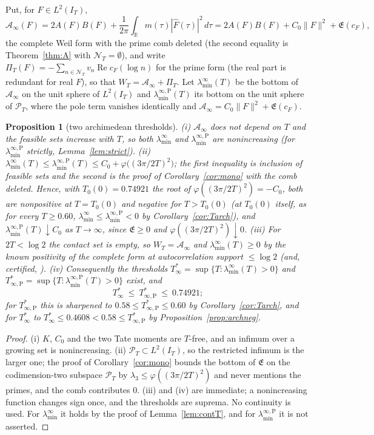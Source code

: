 \documentclass[11pt]{amsart}
\newtheorem{proposition}[theorem]{Proposition}
\theoremstyle{definition}
\theoremstyle{remark}
\newcommand{\R}{\mathbb R}
\newcommand{\Rel}{\operatorname{Re}}
\newcommand{\PT}{\mathcal P_T}
\newcommand{\IT}{I_T}
\newcommand{\Fh}{\widehat F}
\newcommand{\cF}{c_F}
\newcommand{\Lev}{\mathfrak E}
\newcommand{\NT}{\mathcal N_T}
\newcommand{\Ainf}{\mathcal A_\infty}
\newcommand{\PiT}{\Pi_T}
\newcommand{\laminf}{\lambda^{\infty}_{\min}}
\newcommand{\laminfP}{\lambda^{\infty,\mathrm P}_{\min}}
\begin{document}
Put, for $F\in L^2(\IT)$,
\[
\Ainf(F)=2A(F)B(F)+\frac1{2\pi}\int_\R m(\tau)|\Fh(\tau)|^2\,d\tau
=2A(F)B(F)+C_0\|F\|^2+\Lev(\cF),
\]
the complete Weil form with the prime comb deleted (the second equality is Theorem~\ref{thm:A} with
$\NT=\emptyset$), and write $\PiT(F)=-\sum_{n\in\NT}v_n\Rel\cF(\log n)$ for the prime form (the real part is redundant for real $F$), so that
$W_T=\Ainf+\PiT$. Let $\laminf(T)$ be the bottom of $\Ainf$ on the unit sphere of $L^2(\IT)$ and
$\laminfP(T)$ its bottom on the unit sphere of $\PT$, where the pole term vanishes identically and
$\Ainf=C_0\|F\|^2+\Lev(\cF)$.

\begin{proposition}[two archimedean thresholds]\label{prop:arch}
\emph{(i)} $\Ainf$ does not depend on $T$ and the feasible sets increase with $T$, so both
$\laminf$ and $\laminfP$ are nonincreasing (for $\laminfP$ strictly, Lemma~\ref{lem:strict}).
\emph{(ii)} $\laminf(T)\le\laminfP(T)\le C_0+\varphi\big((3\pi/2T)^2\big)$; the first inequality is
inclusion of feasible sets and the second is the proof of Corollary~\ref{cor:mono} with the comb deleted. Hence, with
$T_0(0)=0.74921$ the root of $\varphi((3\pi/2T)^2)=-C_0$, both are nonpositive at $T=T_0(0)$ and negative for $T>T_0(0)$ (at $T_0(0)$
itself, as for every $T\ge0.60$, $\laminf\le\laminfP<0$ by Corollary~\ref{cor:Tarch}), and $\laminfP(T)\downarrow C_0$ as
$T\to\infty$, since $\Lev\ge0$ and $\varphi((3\pi/2T)^2)\downarrow0$.
\emph{(iii)} For $2T<\log2$ the contact set is empty, so $W_T=\Ainf$ and $\laminf(T)\ge0$ by the
known positivity of the complete form at autocorrelation support $\le\log2$
\textup{\cite{Yoshida1992,Bombieri2000}} (and, certified, \cite[Thm.~1.2]{Zhu2026}).
\emph{(iv)} Consequently the thresholds
$T^*_\infty=\sup\{T:\laminf(T)>0\}$ and $T^*_{\infty,\mathrm P}=\sup\{T:\laminfP(T)>0\}$ exist, and
\[
T^*_\infty\ \le\ T^*_{\infty,\mathrm P}\ \le\ 0.74921 ;
\]
for $T^*_{\infty,\mathrm P}$ this is sharpened to $0.58\le T^*_{\infty,\mathrm P}\le0.60$ by
Corollary~\ref{cor:Tarch}, and for $T^*_\infty$ to $T^*_\infty\le0.4608<0.58\le T^*_{\infty,\mathrm P}$ by
Proposition~\ref{prop:archneg}.
\end{proposition}
\begin{proof}
(i) $K$, $C_0$ and the two Tate moments are $T$-free, and an infimum over a growing set is
nonincreasing. (ii) $\PT\subset L^2(\IT)$, so the restricted infimum is the larger one; the proof of
Corollary~\ref{cor:mono} bounds the bottom of $\Lev$ on the codimension-two subspace $\PT$ by
$\lambda_3\le\varphi((3\pi/2T)^2)$ and never mentions the primes, and the comb contributes $0$.
(iii) and (iv) are immediate; a nonincreasing function changes sign once, and the thresholds are
suprema. No continuity is used. For $\laminf$ it holds by the proof of Lemma~\ref{lem:contT}, and for
$\laminfP$ it is not asserted.
\end{proof}
\end{document}
